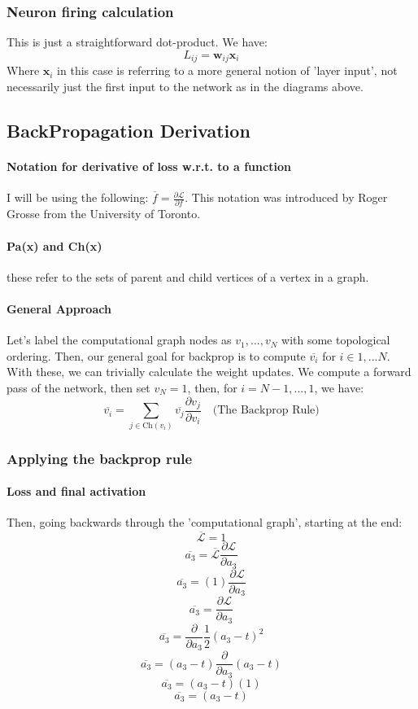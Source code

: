 \documentclass{article}
\begin{document}
\subsubsection{Neuron firing calculation} This is just a straightforward dot-product. We have:
\[L_{ij}=\bm{w}_{ij}\bm{x}_i \]
Where $\bm{x}_i$ in this case is referring to a more general notion of 'layer input', not necessarily just the first input to the network as in the diagrams above.
\subsection{BackPropagation Derivation}
\paragraph{Notation for derivative of loss w.r.t. to a function} I will be using the following: $\overline{f} = \frac{\partial{\mathcal{L}}}{\partial{f}}$. This notation was introduced by Roger Grosse from the University of Toronto.
\paragraph{Pa(x) and Ch(x)} these refer to the sets of parent and child vertices of a vertex in a graph.
\paragraph{General Approach} Let's label the computational graph nodes as $v_1,...,v_N$ with some topological ordering. 
Then, our general goal for backprop is to compute $\overline{v_i}$ for $i \in {1,...N}$. With these, we can trivially calculate the weight updates.
We compute a forward pass of the network, then set $v_N=1$, then, for $i=N-1, ... , 1$, we have:
\begin{equation}
    \overline{v_i} = \sum_{j \in \text{Ch}(v_i)} \overline{v_j} \frac{\partial{v_j}}{\partial{v_i}} \quad  \text{(The Backprop Rule)}
\end{equation}
\subsubsection{Applying the backprop rule}
\paragraph{Loss and final activation}
Then, going backwards through the 'computational graph', starting at the end:
\begin{equation}\overline{\mathcal{L}} = 1\end{equation}
\[\overline{a_3} = \overline{\mathcal{L}} \frac{\partial{\mathcal{L}}}{\partial{a_3}}\]
\[\overline{a_3} = (1) \frac{\partial{\mathcal{L}}}{\partial{a_3}}\]
\[\overline{a_3} = \frac{\partial{\mathcal{L}}}{\partial{a_3}}\]
\[\overline{a_3} = \frac{\partial}{\partial{a_3}} \frac{1}{2}(a_3 - t)^{2}\]
\[\overline{a_3} = (a_3 - t) \frac{\partial}{\partial{a_3}} (a_3 - t)\]
\[\overline{a_3} = (a_3 - t) (1)\]
\begin{equation}
\overline{a_3} = (a_3 - t)
\end{equation}
\end{document}
